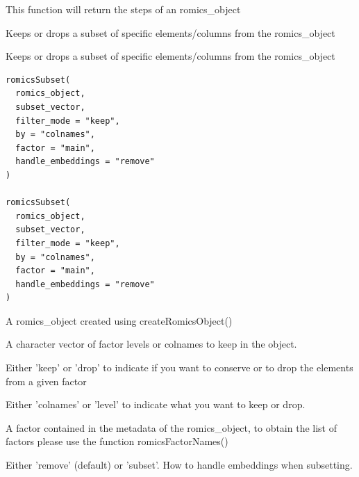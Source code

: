 \documentclass[a4paper]{book}
\begin{document}
%
\begin{Value}
This function will return the steps of an romics\_object
\end{Value}
%
\begin{Description}
Keeps or drops a subset of specific elements/columns from the romics\_object

Keeps or drops a subset of specific elements/columns from the romics\_object
\end{Description}
%
\begin{Usage}
\begin{verbatim}
romicsSubset(
  romics_object,
  subset_vector,
  filter_mode = "keep",
  by = "colnames",
  factor = "main",
  handle_embeddings = "remove"
)

romicsSubset(
  romics_object,
  subset_vector,
  filter_mode = "keep",
  by = "colnames",
  factor = "main",
  handle_embeddings = "remove"
)
\end{verbatim}
\end{Usage}
%
\begin{Arguments}
\begin{ldescription}
\item[\code{romics\_object}] A romics\_object created using createRomicsObject()

\item[\code{subset\_vector}] A character vector of factor levels or colnames to keep in the object.

\item[\code{filter\_mode}] Either 'keep' or 'drop' to indicate if you want to conserve or to drop the elements from a given factor

\item[\code{by}] Either 'colnames' or 'level' to indicate what you want to keep or drop.

\item[\code{factor}] A factor contained in the metadata of the romics\_object, to obtain the list of factors please use the function romicsFactorNames()

\item[\code{handle\_embeddings}] Either 'remove' (default) or 'subset'. How to handle embeddings when subsetting.
\end{ldescription}
\end{Arguments}
%
\end{document}
